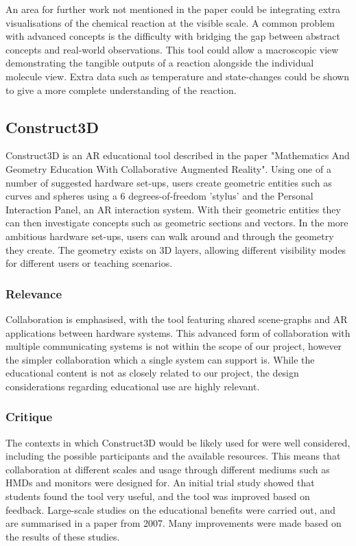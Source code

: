 An area for further work not mentioned in the paper could be integrating extra visualisations of the chemical reaction at the visible scale. A common problem with advanced concepts is the difficulty with bridging the gap between abstract concepts and real-world observations. This tool could allow a macroscopic view demonstrating the tangible outputs of a reaction alongside the individual molecule view. Extra data such as temperature and state-changes could be shown to give a more complete understanding of the reaction.

\subsection{Construct3D}
Construct3D is an AR educational tool described in the paper "Mathematics And Geometry Education With Collaborative Augmented Reality"\cite{Kaufmann03}. Using one of a number of suggested hardware set-ups, users create geometric entities such as curves and spheres using a 6 degrees-of-freedom 'stylus' and the Personal Interaction Panel, an AR interaction system\cite{szal97}. With their geometric entities they can then investigate concepts such as geometric sections and vectors. In the more ambitious hardware set-ups, users can walk around and through the geometry they create. The geometry exists on 3D layers, allowing different visibility modes for different users or teaching scenarios.

\subsubsection{Relevance}
Collaboration is emphasised, with the tool featuring shared scene-graphs and AR applications between hardware systems. This advanced form of collaboration with multiple communicating systems is not within the scope of our project, however the simpler collaboration which a single system can support is. While the educational content is not as closely related to our project, the design considerations regarding educational use are highly relevant.

\subsubsection{Critique}
The contexts in which Construct3D would be likely used for were well considered, including the possible participants and the available resources. This means that collaboration at different scales and usage through different mediums such as HMDs and monitors were designed for. An initial trial study showed that students found the tool very useful, and the tool was improved based on feedback. Large-scale studies on the educational benefits were carried out, and are summarised in a paper from 2007\cite{Kaufmann07}. Many improvements were made based on the results of these studies.

